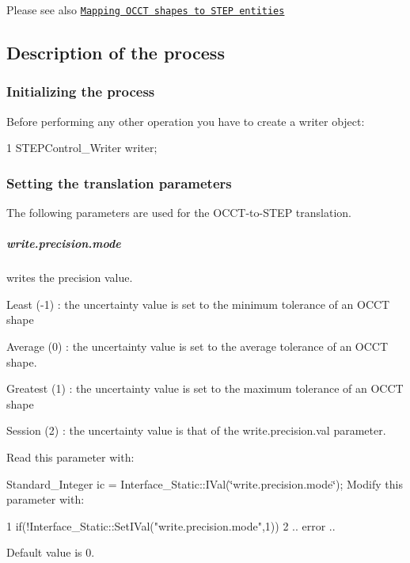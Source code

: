 Please see also \href{#occt_step_3_4}{\tt Mapping O\+C\+CT shapes to S\+T\+EP entities}\hypertarget{occt_user_guides__step_occt_step_3_3}{}\subsection{Description of the process}\label{occt_user_guides__step_occt_step_3_3}
\hypertarget{occt_user_guides__step_occt_step_3_3_1}{}\subsubsection{Initializing the process}\label{occt_user_guides__step_occt_step_3_3_1}
Before performing any other operation you have to create a writer object\+: 
\begin{DoxyCode}
1 STEPControl\_Writer writer; 
\end{DoxyCode}
 \hypertarget{occt_user_guides__step_occt_step_3_3_2}{}\subsubsection{Setting the translation parameters}\label{occt_user_guides__step_occt_step_3_3_2}
The following parameters are used for the O\+C\+C\+T-\/to-\/\+S\+T\+EP translation.

\subparagraph*{write.\+precision.\+mode}

writes the precision value.
\begin{DoxyItemize}
\item Least (-\/1) \+: the uncertainty value is set to the minimum tolerance of an O\+C\+CT shape
\item Average (0) \+: the uncertainty value is set to the average tolerance of an O\+C\+CT shape.
\item Greatest (1) \+: the uncertainty value is set to the maximum tolerance of an O\+C\+CT shape
\item Session (2) \+: the uncertainty value is that of the write.\+precision.\+val parameter.
\end{DoxyItemize}

Read this parameter with\+:

Standard\+\_\+\+Integer ic = Interface\+\_\+\+Static\+::\+I\+Val(\char`\"{}write.\+precision.\+mode\char`\"{}); Modify this parameter with\+: 
\begin{DoxyCode}
1 if(!Interface\_Static::SetIVal("write.precision.mode",1))  
2 .. error .. 
\end{DoxyCode}
 Default value is 0.

